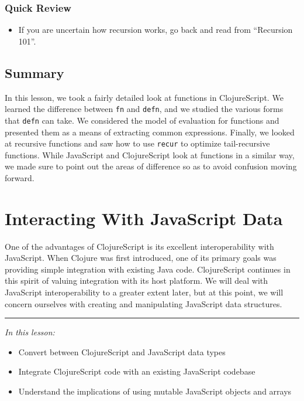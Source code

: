 \documentclass[10pt,twoside,openright]{memoir}
\begin{document}
\subsection{Quick Review}

\begin{itemize}
\tightlist
\item
  If you are uncertain how recursion works, go back and read from
  ``Recursion 101''.
\end{itemize}


\section{Summary}

In this lesson, we took a fairly detailed look at functions in
ClojureScript. We learned the difference between \texttt{fn} and
\texttt{defn}, and we studied the various forms that \texttt{defn} can
take. We considered the model of evaluation for functions and presented
them as a means of extracting common expressions. Finally, we looked at
recursive functions and saw how to use \texttt{recur} to optimize
tail-recursive functions. While JavaScript and ClojureScript look at
functions in a similar way, we made sure to point out the areas of
difference so as to avoid confusion moving forward.

\chapter{Interacting With JavaScript Data}

One of the advantages of ClojureScript is its excellent interoperability
with JavaScript. When Clojure was first introduced, one of its primary
goals was providing simple integration with existing Java code.
ClojureScript continues in this spirit of valuing integration with its
host platform. We will deal with JavaScript interoperability to a
greater extent later, but at this point, we will concern ourselves with
creating and manipulating JavaScript data structures.

\begin{center}\rule{0.5\linewidth}{0.5pt}\end{center}

\emph{In this lesson:}

\begin{itemize}
\tightlist
\item
  Convert between ClojureScript and JavaScript data types
\item
  Integrate ClojureScript code with an existing JavaScript codebase
\item
  Understand the implications of using mutable JavaScript objects and
  arrays
\end{itemize}
\end{document}

